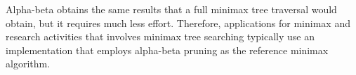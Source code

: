 Alpha-beta obtains the same results that a full minimax tree traversal would obtain, but it requires much less effort. Therefore, applications for minimax and research activities that involves minimax tree searching typically use an implementation that employs alpha-beta pruning as the reference minimax algorithm.        

  



